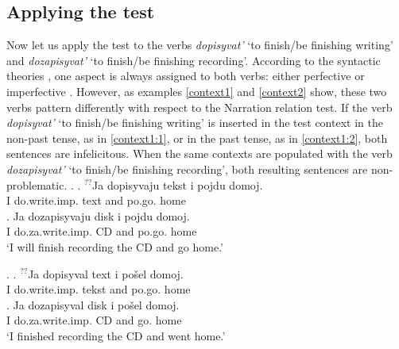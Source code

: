\subsection{Applying the test}\label{subsection:bi:apply}
Now let us apply the test to the verbs \textit{dopisyvat'} `to finish/be finishing writing' and \textit{dozapisyvat'} `to finish/be finishing recording'. According to the syntactic theories , one aspect is always assigned to both verbs: either perfective \citep{Ramchand:04, Romanova:04, Svenonius:04b} or imperfective \citep{Tatevosov:07, Tatevosov:09}. However, as examples \ref{context1} and \ref{context2} show, these two verbs pattern differently with respect to the Narration relation  test. If the verb \textit{dopisyvat'} `to finish/be finishing writing' is inserted in the test context   in the non-past   tense, as in \ref{context1:1}, or in the past  tense, as in \ref{context1:2}, both sentences are infelicitous. When the same contexts   are populated with the verb \textit{dozapisyvat'} `to finish/be finishing recording', both resulting sentences are non-problematic.
\ex.\label{context1} \ag. \label{context1:1}$^{??}$Ja dopisyvaju tekst i pojdu\textsuperscript{\PF} domoj.\\
{}I do.write.imp. text and po.go. home\\
\bg. \label{context2:1}Ja dozapisyvaju disk i pojdu\textsuperscript{\PF} domoj.\\
I do.za.write.imp. CD and po.go. home\\
\trans `I will finish recording the CD and go home.'

\ex.\label{context2} \ag. \label{context1:2}$^{??}$Ja dopisyval text i po\v{s}el\textsuperscript{\PF} domoj.\\
{}I do.write.imp. tekst and po.go. home\\
\bg. \label{context2:2}Ja dozapisyval disk i po\v{s}el\textsuperscript{\PF} domoj.\\
I do.za.write.imp. CD and go. home\\
\trans `I finished recording the CD and went home.'

